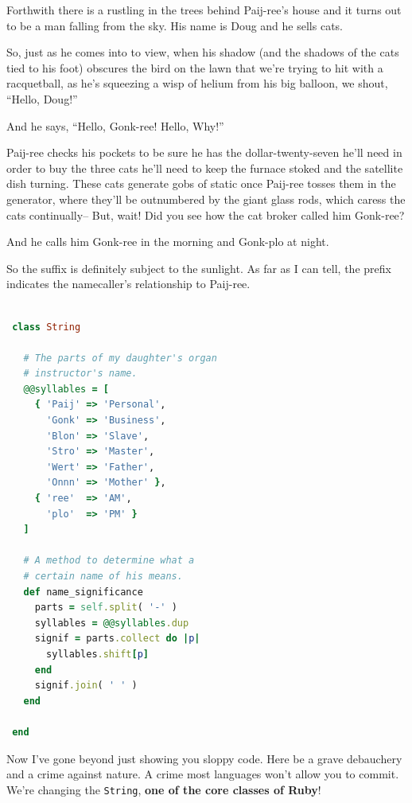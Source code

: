 \documentclass[10pt,twoside]{report}
\begin{document}
Forthwith there is a rustling in the trees behind Paij-ree's house and
it turns out to be a man falling from the sky.  His name is Doug and
he sells cats.

So, just as he comes into to view, when his shadow (and the shadows of
the cats tied to his foot) obscures the bird on the lawn that we're
trying to hit with a racquetball, as he's squeezing a wisp of helium
from his big balloon, we shout, ``Hello, Doug!''

And he says, ``Hello, Gonk-ree!  Hello, Why!''

Paij-ree checks his pockets to be sure he has the dollar-twenty-seven
he'll need in order to buy the three cats he'll need to keep the
furnace stoked and the satellite dish turning.  These cats generate
gobs of static once Paij-ree tosses them in the generator, where
they'll be outnumbered by the giant glass rods, which caress the cats
continually-- But, wait!  Did you see how the cat broker called him
Gonk-ree?

And he calls him Gonk-ree in the morning and Gonk-plo at night.

So the suffix is definitely subject to the sunlight.  As far as I can
tell, the prefix indicates the namecaller's relationship to Paij-ree.


\begin{lstlisting}[basicstyle=\ttfamily\color{basiccolor},
    commentstyle = \ttfamily\color{commentcolor},
    keywordstyle=\ttfamily\color{keywordscolor},
    stringstyle=\color{stringcolor},
    language=Ruby,
    basicstyle=\small\ttfamily,
    showstringspaces=false,
  ]

 class String

   # The parts of my daughter's organ
   # instructor's name.
   @@syllables = [
     { 'Paij' => 'Personal',
       'Gonk' => 'Business',
       'Blon' => 'Slave',
       'Stro' => 'Master',
       'Wert' => 'Father',
       'Onnn' => 'Mother' },
     { 'ree'  => 'AM',
       'plo'  => 'PM' }
   ]

   # A method to determine what a
   # certain name of his means.
   def name_significance
     parts = self.split( '-' )
     syllables = @@syllables.dup
     signif = parts.collect do |p|
       syllables.shift[p]
     end
     signif.join( ' ' )
   end

 end

\end{lstlisting}


Now I've gone beyond just showing you sloppy code.  Here be a grave
debauchery and a crime against nature.  A crime most languages won't
allow you to commit.  We're changing the
\lstinline[breaklines=true]|String|, {\bf one of the core classes of
  Ruby}!
\end{document}
